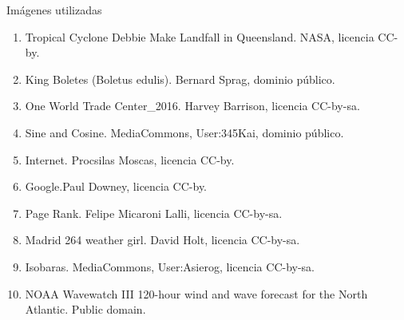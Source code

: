 \documentclass[
  unknownkeysallowed %
]{beamer}
\begin{document}
\begin{frame}{Imágenes utilizadas}
  \scriptsize
  \begin{enumerate}
  \item Tropical Cyclone Debbie Make Landfall in Queensland. NASA, licencia CC-by.
  \item King Boletes (Boletus edulis). Bernard Sprag, dominio público.
  \item One World Trade Center\_2016. Harvey Barrison, licencia CC-by-sa.
  \item Sine and Cosine. MediaCommons, User:345Kai, dominio público.
  \item Internet. Procsilas Moscas, licencia CC-by.
  \item Google.Paul Downey, licencia CC-by.
  \item Page Rank. Felipe Micaroni Lalli, licencia CC-by-sa.
  \item Madrid 264 weather girl. David Holt, licencia CC-by-sa.
  \item Isobaras. MediaCommons, User:Asierog, licencia CC-by-sa.
  \item NOAA Wavewatch III 120-hour wind and wave forecast for the
    North Atlantic. Public domain.
  \end{enumerate}
\end{frame}
\end{document}
